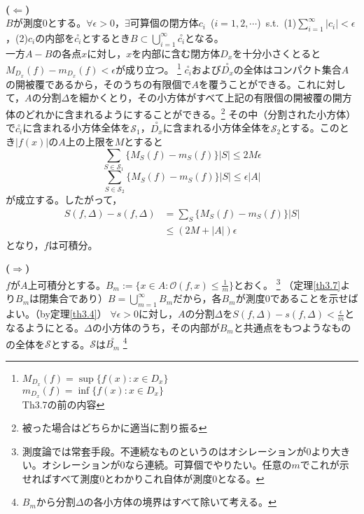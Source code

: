 \documentclass[dvipdfmx,a4j,10pt]{jsarticle}
\makeatletter
\theoremstyle{mystyle1}
\theoremstyle{mystyle2}
\renewenvironment{proof}[1][\proofname]{\par
  \pushQED{\qed}%
  \normalfont
  \topsep6\p@\@plus6\p@ \trivlist
  \item[\hskip\labelsep{\bfseries\sffamily #1}]\ignorespaces
}{%
  \popQED\endtrivlist\@endpefalse
}
\renewcommand\proofname{証明}
\makeatother
\begin{document}
\begin{proof}\
	\par\noindent\textbf{($\Leftarrow$)}\\
	$B$が測度$0$とする。$\forall\epsilon>0$，$\exists$可算個の閉方体$c_i$\ ($i=1,2,\cdots$)\ s.t.\ (1)$\sum_{i=1}^\infty|c_i|<\epsilon$，(2)$c_i$の内部を$\overset{\circ}{c_i}$とするとき$B\subset\bigcup_{i=1}^\infty \overset{\circ}{c_i}$となる。\\
	一方$A-B$の各点$x$に対し，$x$を内部に含む閉方体$D_x$を十分小さくとると$M_{D_x}(f)-m_{D_x}(f)<\epsilon$が成り立つ。
    \footnote{
    $M_{D_x}(f)=\sup\{f(x):x\in D_x\}$\\
    $m_{D_x}(f)=\inf\{f(x):x\in D_x\}$\\
    Th3.7の前の内容
    }
	$\overset{\circ}{c_i}$および$\overset{\circ}{D_x}$の全体はコンパクト集合$A$の開被覆であるから，そのうちの有限個で$A$を覆うことができる。これに対して，$A$の分割$\Delta$を細かくとり，その小方体がすべて上記の有限個の開被覆の開方体のどれかに含まれるようにすることができる。\footnote{
    被った場合はどちらかに適当に割り振る
    }
	その中（分割された小方体）で$\overset{\circ}{c_i}$に含まれる小方体全体を$\mathscr{S}_1$，$\overset{\circ}{D_{x}}$に含まれる小方体全体を$\mathscr{S}_2$とする。このとき$|f(x)|$の$A$上の上限を$M$とすると
	\[
		\sum_{S\in\mathscr{S}_1}\{M_S(f)-m_S(f)\}|S|\leq 2M\epsilon
	\]
	\[
		\sum_{S\in\mathscr{S}_2}\{M_S(f)-m_S(f)\}|S|\leq \epsilon|A|
	\]
	が成立する。したがって，
	\[
	\begin{split}
	S(f,\Delta)-s(f,\Delta)&=\sum_{S}\{M_S(f)-m_S(f)\}|S| \\
	&\leq (2M+|A|)\epsilon
	\end{split}
	\]
	となり，$f$は可積分。
	\par\noindent\textbf{($\Rightarrow$)}\\
	$f$が$A$上可積分とする。$\displaystyle B_m:=\{x\in A:\mathscr{O}(f,x)\leq\frac{1}{m}\}$とおく。
    \footnote{
    測度論では常套手段。不連続なものというのはオシレーションが0より大きい。オシレーションが0なら連続。可算個でやりたい。任意の$m$でこれが示せればすべて測度0とわかりこれ自体が測度0となる。
    }
	（定理\ref{th3.7}より$B_m$は閉集合であり）$\displaystyle B=\bigcup_{m=1}^\infty B_m$だから，各$B_m$が測度0であることを示せばよい。（by定理\ref{th3.4}）
	$\forall\epsilon>0$に対し，$A$の分割$\Delta$を$\displaystyle S(f,\Delta)-s(f,\Delta)<\frac{\epsilon}{m}$となるようにとる。$\Delta$の小方体のうち，その内部が$B_m$と共通点をもつようなものの全体を$\mathscr{S}$とする。$\mathscr{S}$は$\overset{\circ}{B_m}$
    \footnote{
    $B_m$から分割$\Delta$の各小方体の境界はすべて除いて考える。
}
\end{proof}
\end{document}
